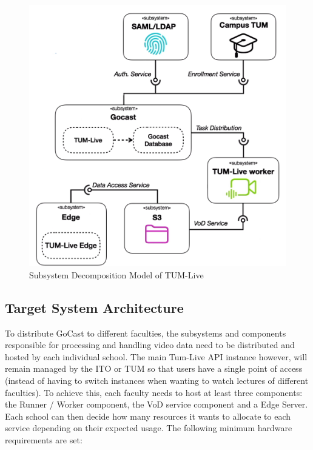 \begin{figure}[htpb]
    \centering
    \includegraphics[width=\textwidth]{images/OldDeploymentDiagram.png}
    \caption[Subsystem Decomposition]{Subsystem Decomposition Model of TUM-Live}\label{fig:system-architecture}
\end{figure}

\subsection{Target System Architecture}

To distribute GoCast to different faculties, the subsystems and components responsible for processing and handling video data need to be distributed and hosted by each individual school. 
The main Tum-Live API instance however, will remain managed by the \ac{ITO} or TUM so that users have a single point of access (instead of having to switch instances when wanting to watch lectures of different faculties).
To achieve this, each faculty needs to host at least three components: the Runner / Worker component, the VoD service component and a Edge Server. 
Each school can then decide how many resources it wants to allocate to each service depending on their expected usage. The following minimum hardware requirements are set:

